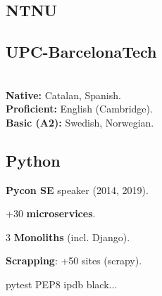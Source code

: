 \documentclass[a4paper]{MagicalCV}
\begin{document}
\lastupdated


\begin{minipage}[t]{0.33\textwidth}


\subsection{NTNU}
\vspace{\topsep} %

\sectionsep

\subsection{UPC-BarcelonaTech}
\sectionsep

 \\
\textbf{Native: } Catalan, Spanish. \\
\textbf{Proficient: } English (Cambridge). \\
\textbf{Basic (A2): } Swedish, Norwegian.\\

\sectionsep

\sectionsep
\subsection{Python}
\begin{tightemize}
\item {\bf Pycon SE} speaker (2014, 2019). %
\item +30 {\bf microservices}.
\item 3 {\bf Monoliths} (incl. Django).
\item {\bf Scrapping}: +50 sites (scrapy).
\item pytest \textbullet{} PEP8 \textbullet{} ipdb \textbullet{} black...
\end{tightemize}
\sectionsep

\end{minipage}
\end{document}
